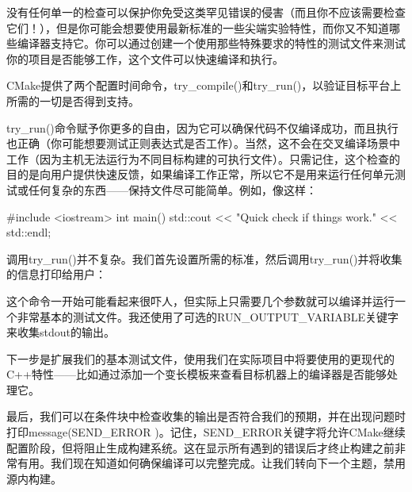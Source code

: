 没有任何单一的检查可以保护你免受这类罕见错误的侵害（而且你不应该需要检查它们！），但是你可能会想要使用最新标准的一些尖端实验特性，而你又不知道哪些编译器支持它。你可以通过创建一个使用那些特殊要求的特性的测试文件来测试你的项目是否能够工作，这个文件可以快速编译和执行。

CMake提供了两个配置时间命令，try\_compile()和try\_run()，以验证目标平台上所需的一切是否得到支持。

try\_run()命令赋予你更多的自由，因为它可以确保代码不仅编译成功，而且执行也正确（你可能想要测试正则表达式是否工作）。当然，这不会在交叉编译场景中工作（因为主机无法运行为不同目标构建的可执行文件）。只需记住，这个检查的目的是向用户提供快速反馈，如果编译工作正常，所以它不是用来运行任何单元测试或任何复杂的东西——保持文件尽可能简单。例如，像这样：


\begin{cpp}
#include <iostream>
int main()
{
    std::cout << "Quick check if things work." << std::endl;
}
\end{cpp}

调用try\_run()并不复杂。我们首先设置所需的标准，然后调用try\_run()并将收集的信息打印给用户：



这个命令一开始可能看起来很吓人，但实际上只需要几个参数就可以编译并运行一个非常基本的测试文件。我还使用了可选的RUN\_OUTPUT\_VARIABLE关键字来收集stdout的输出。

下一步是扩展我们的基本测试文件，使用我们在实际项目中将要使用的更现代的C++特性——比如通过添加一个变长模板来查看目标机器上的编译器是否能够处理它。

最后，我们可以在条件块中检查收集的输出是否符合我们的预期，并在出现问题时打印message(SEND\_ERROR )。记住，SEND\_ERROR关键字将允许CMake继续配置阶段，但将阻止生成构建系统。这在显示所有遇到的错误后才终止构建之前非常有用。我们现在知道如何确保编译可以完整完成。让我们转向下一个主题，禁用源内构建。
























